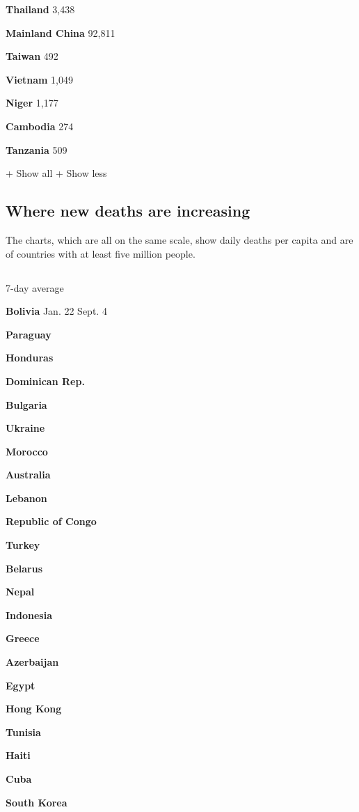 \textbf{Thailand} 3,438

\textbf{Mainland China} 92,811

\textbf{Taiwan} 492

\textbf{Vietnam} 1,049

\textbf{Niger} 1,177

\textbf{Cambodia} 274

\textbf{Tanzania} 509

+ Show all + Show less

\hypertarget{where-new-deaths-are-increasing}{%
\subsection{Where new deaths are
increasing}\label{where-new-deaths-are-increasing}}

The charts, which are all on the same scale, show daily deaths per
capita and are of countries with at least five million people.

\hypertarget{-2}{%
\subsection{}\label{-2}}

7-day average

\textbf{Bolivia} Jan. 22 Sept. 4

\textbf{Paraguay}

\textbf{Honduras}

\textbf{Dominican Rep.}

\textbf{Bulgaria}

\textbf{Ukraine}

\textbf{Morocco}

\textbf{Australia}

\textbf{Lebanon}

\textbf{Republic of Congo}

\textbf{Turkey}

\textbf{Belarus}

\textbf{Nepal}

\textbf{Indonesia}

\textbf{Greece}

\textbf{Azerbaijan}

\textbf{Egypt}

\textbf{Hong Kong}

\textbf{Tunisia}

\textbf{Haiti}

\textbf{Cuba}

\textbf{South Korea}


